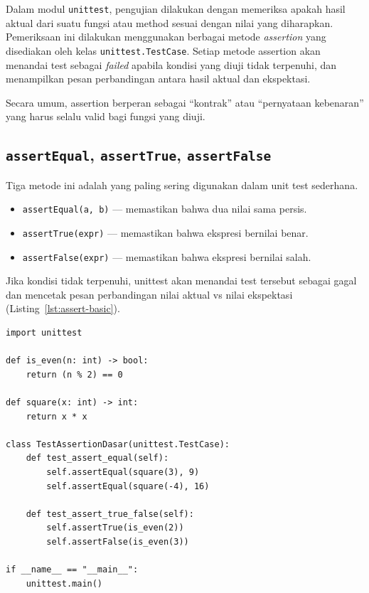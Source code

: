 Dalam modul \texttt{unittest}, pengujian dilakukan dengan memeriksa apakah hasil aktual dari suatu fungsi atau method sesuai dengan nilai yang diharapkan.  
Pemeriksaan ini dilakukan menggunakan berbagai metode \textit{assertion} yang disediakan oleh kelas \texttt{unittest.TestCase}.  
Setiap metode assertion akan menandai test sebagai \textit{failed} apabila kondisi yang diuji tidak terpenuhi, dan menampilkan pesan perbandingan antara hasil aktual dan ekspektasi.

Secara umum, assertion berperan sebagai “kontrak” atau “pernyataan kebenaran” yang harus selalu valid bagi fungsi yang diuji.

\subsection{\texttt{assertEqual}, \texttt{assertTrue}, \texttt{assertFalse}}

Tiga metode ini adalah yang paling sering digunakan dalam unit test sederhana.

\begin{itemize}
    \item \texttt{assertEqual(a, b)} — memastikan bahwa dua nilai sama persis.
    \item \texttt{assertTrue(expr)} — memastikan bahwa ekspresi bernilai benar.
    \item \texttt{assertFalse(expr)} — memastikan bahwa ekspresi bernilai salah.
\end{itemize}

Jika kondisi tidak terpenuhi, unittest akan menandai test tersebut sebagai gagal dan mencetak pesan perbandingan nilai aktual vs nilai ekspektasi (Listing~\ref{lst:assert-basic}).

\begin{lstlisting}[style=PythonStyle, caption={Contoh penggunaan assertEqual, assertTrue, dan assertFalse}, label={lst:assert-basic}]
import unittest

def is_even(n: int) -> bool:
    return (n % 2) == 0

def square(x: int) -> int:
    return x * x

class TestAssertionDasar(unittest.TestCase):
    def test_assert_equal(self):
        self.assertEqual(square(3), 9)
        self.assertEqual(square(-4), 16)

    def test_assert_true_false(self):
        self.assertTrue(is_even(2))
        self.assertFalse(is_even(3))

if __name__ == "__main__":
    unittest.main()
\end{lstlisting}

